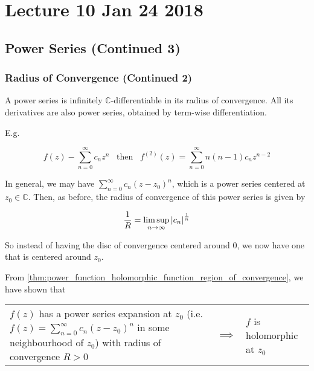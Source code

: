 \documentclass[11pt, oneside]{book}
\begin{document}



\chapter{Lecture 10 Jan 24 2018}
	\label{chapter:lecture_10_jan_24_2018}

\section{Power Series (Continued 3)} %
\label{sec:power_series_continued_3}

\subsection{Radius of Convergence (Continued 2)} %
\label{sub:radius_of_convergence_continued_2}

A power series is infinitely $\mathbb{C}$-differentiable in its radius of convergence. All its derivatives are also power series, obtained by term-wise differentiation.

E.g.

\begin{equation*}
	f(z) - \sum_{n=0}^{\infty} c_n z^n \enspace \text{ then } \enspace f^{(2)}(z) = \sum_{n=0}^{\infty} n(n-1)c_n z^{n - 2}
\end{equation*}

In general, we may have $\sum_{n=0}^{\infty} c_n (z - z_0)^n$, which is a power series centered at $z_0 \in \mathbb{C}$. Then, as before, the radius of convergence of this power series is given by

\begin{equation*}
	\frac{1}{R} = \limsup_{n \to \infty} \left|c_n\right|^\frac{1}{n}
\end{equation*}

So instead of having the disc of convergence centered around $0$, we now have one that is centered around $z_0$.

\begin{crly}
	From \cref{thm:power_function_holomorphic_function_region_of_convergence}, we have shown that

	\begin{tabular}{L{7cm} C{2cm} R{5cm}}
		$f(z)$ has a power series expansion at $z_0$ (i.e. $f(z) = \sum_{n=0}^\infty c_n (z - z_0)^n$ in some neighbourhood of $z_0$) with radius of convergence $R > 0$ &
		$\implies$ &
		$f$ is holomorphic at $z_0$
	\end{tabular}
\end{crly}
\end{document}
